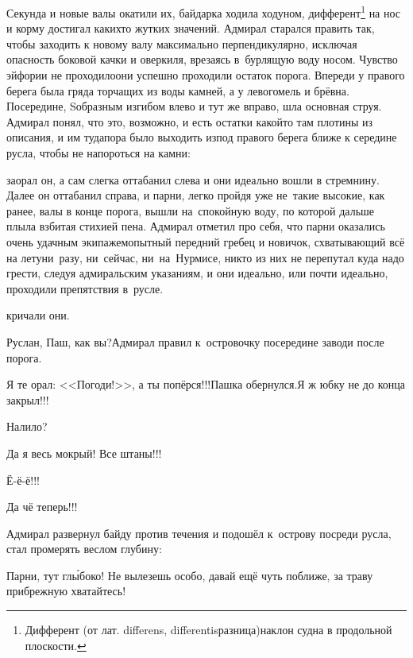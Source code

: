 \renewcommand*{\thefootnote}{\fnsymbol{footnote}}
\setcounter{footnote}{0}
Секунда и новые валы окатили их, байдарка ходила ходуном, дифферент\footnote{Дифферент (от лат. differens, differentis\mdash разница)\mdash наклон судна в продольной плоскости\cite{МорскойСправочник}.} на нос и корму достигал каких\sdash то жутких значений. Адмирал старался править так, чтобы заходить к новому валу максимально перпендикулярно, исключая опасность боковой качки и оверкиля, врезаясь в~бурлящую воду носом. Чувство эйфории не проходило\mdash они успешно проходили остаток порога. Впереди у правого берега была гряда торчащих из воды камней, а у левого\mdash мель и брёвна. Посередине, S\sdash образным изгибом влево и тут же вправо, шла основная струя. Адмирал понял, что это, возможно, и есть остатки какой\sdash то там плотины из описания, и им туда\mdash пора было выходить из\sdash под правого берега ближе к середине русла, чтобы не напороться на камни:

\mdash заорал он, а сам слегка оттабанил слева и они идеально вошли в стремнину. Далее он оттабанил справа, и парни, легко пройдя уже не~такие высокие, как ранее, валы в конце порога, вышли на~спокойную воду, по которой дальше плыла взбитая стихией пена. Адмирал отметил про себя, что парни оказались очень удачным экипажем\mdash опытный передний гребец и новичок, схватывающий всё на лету\mdash ни~разу, ни~сейчас, ни~на~Нурмисе, никто из них не перепутал куда надо грести, следуя адмиральским указаниям, и они идеально, или почти идеально, проходили препятствия в~русле.

\mdash кричали они.

\diagdash Руслан, Паш, как вы?\mdash Адмирал правил к~островочку посередине заводи после порога.

\diagdash Я те орал: <<Погоди!>>, а ты попёрся!!!\mdash Пашка обернулся.\mdash Я ж юбку не до конца закрыл!!!

\diagdash Налило?

\diagdash Да я весь мокрый! Все штаны!!!

\diagdash Ё-ё-ё!!!

\diagdash Да чё теперь!!!

Адмирал развернул байду против течения и подошёл к~острову посреди русла, стал промерять веслом глубину:

\diagdash Парни, тут гл{\'ы}боко! Не вылезешь особо, давай ещё чуть поближе, за траву прибрежную хватайтесь!


